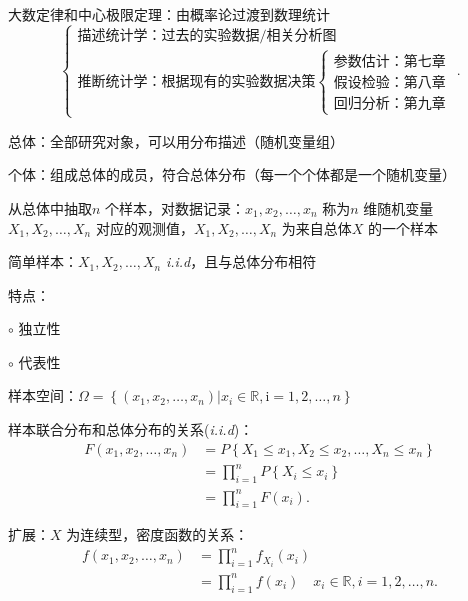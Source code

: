 大数定律和中心极限定理：由概率论过渡到数理统计
\[
    \begin{cases}
        \text{描述统计学：过去的实验数据/相关分析图}\\
        \text{推断统计学：根据现有的实验数据决策}\begin{cases}
            \text{参数估计：第七章}\\
            \text{假设检验：第八章}\\
            \text{回归分析：第九章}
        \end{cases}
    \end{cases}
.\] 
\begin{defi}
    总体：全部研究对象，可以用分布描述（随机变量组）
\end{defi}
\begin{defi}
    个体：组成总体的成员，符合总体分布（每一个个体都是一个随机变量）
\end{defi}
\begin{eg}
    从总体中抽取$n$ 个样本，对数据记录：$x_1,x_2,\ldots ,x_n$ 称为$n$ 维随机变量$X_1,X_2,\ldots ,X_n$ 对应的观测值，$X_1,X_2,\ldots ,X_n$ 为来自总体$X$ 的一个样本
\end{eg}
\begin{notation}
    简单样本：$X_1,X_2,\ldots ,X_n$ \textit{i.i.d}，且与总体分布相符 

    特点：

    $\circ$ 独立性

    $\circ$ 代表性
\end{notation}
\begin{defi}
    样本空间：$\bm{\varOmega}=\left\{ \left( x_1,x_2,\ldots ,x_n \right) |x_i\in \mathbb{R},\mathrm{i}=1,2,\ldots ,n \right\} $
\end{defi}
\begin{notation}
    样本联合分布和总体分布的关系(\textit{i.i.d})：
    \begin{align*}
        F\left( x_1,x_2,\ldots ,x_n \right) &=P\left\{ X_1\le x_1,X_2\le x_2,\ldots ,X_n\le x_n \right\} \\
        &=\prod_{i=1}^{n} P\left\{ X_i\le x_i \right\} \\
        &= \prod_{i=1}^{n} F\left( x_i \right) 
    .\end{align*}
\end{notation}
扩展：$X$ 为连续型，密度函数的关系：
\begin{align*}
    f\left( x_1,x_2,\ldots ,x_n \right) &= \prod_{i=1}^{n} f_{X_i}\left( x_i \right)   \\
    &= \prod_{i=1}^{n} f\left( x_i \right) \quad x_i\in \mathbb{R},i=1,2,\ldots ,n
.\end{align*}
